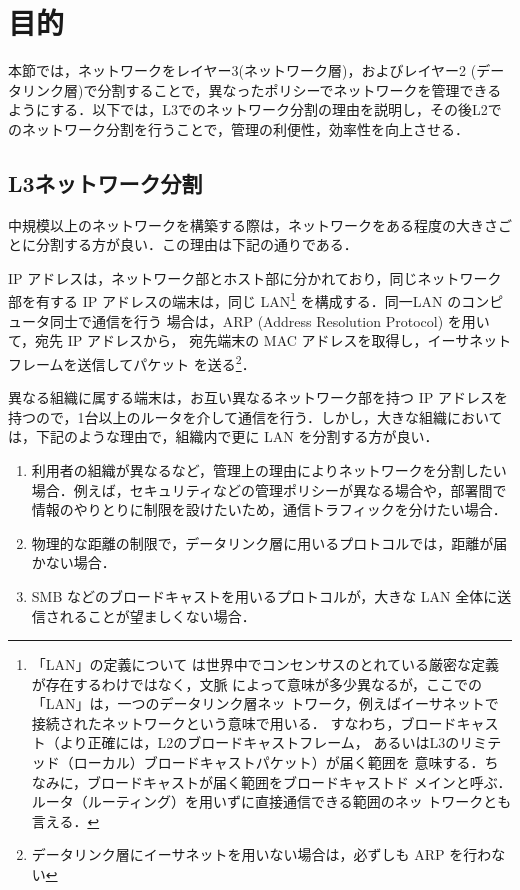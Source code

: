\section{目的}

本節では，ネットワークをレイヤー3(ネットワーク層)，およびレイヤー2 (データリンク層)で分割することで，異なったポリシーでネットワークを管理できるようにする．以下では，L3でのネットワーク分割の理由を説明し，その後L2でのネットワーク分割を行うことで，管理の利便性，効率性を向上させる．

\subsection{L3ネットワーク分割}

中規模以上のネットワークを構築する際は，ネットワークをある程度の大きさごとに分割する方が良い．この理由は下記の通りである．

IP アドレスは，ネットワーク部とホスト部に分かれており，同じネットワーク
部を有する IP アドレスの端末は，同じ LAN\footnote{「LAN」の定義について
は世界中でコンセンサスのとれている厳密な定義が存在するわけではなく，文脈
によって意味が多少異なるが，ここでの「LAN」は，一つのデータリンク層ネッ
トワーク，例えばイーサネットで接続されたネットワークという意味で用いる．
すなわち，ブロードキャスト（より正確には，L2のブロードキャストフレーム，
あるいはL3のリミテッド（ローカル）ブロードキャストパケット）が届く範囲を
意味する．ちなみに，ブロードキャストが届く範囲をブロードキャストド
メインと呼ぶ．ルータ（ルーティング）を用いずに直接通信できる範囲のネッ
トワークとも言える．} を構成する．同一LAN のコンピュータ同士で通信を行う
場合は，ARP (Address Resolution Protocol) を用いて，宛先 IP アドレスから，
宛先端末の MAC アドレスを取得し，イーサネットフレームを送信してパケット
を送る\footnote{データリンク層にイーサネットを用いない場合は，必ずしも 
ARP を行わない}．

異なる組織に属する端末は，お互い異なるネットワーク部を持つ IP アドレスを持つので，1台以上のルータを介して通信を行う．しかし，大きな組織においては，下記のような理由で，組織内で更に LAN を分割する方が良い．
\begin{enumerate}
 \item 利用者の組織が異なるなど，管理上の理由によりネットワークを分割したい場合．例えば，セキュリティなどの管理ポリシーが異なる場合や，部署間で情報のやりとりに制限を設けたいため，通信トラフィックを分けたい場合．
 \item 物理的な距離の制限で，データリンク層に用いるプロトコルでは，距離が届かない場合．
 \item SMB などのブロードキャストを用いるプロトコルが，大きな LAN 全体に送信されることが望ましくない場合．
\end{enumerate}


